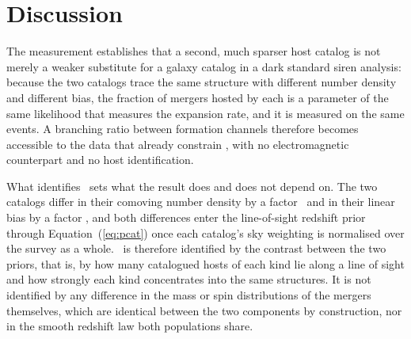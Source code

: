 \section{Discussion}
\label{sec:discussion}

The measurement establishes that a second, much sparser host catalog is not
merely a weaker substitute for a galaxy catalog in a dark standard siren
analysis: because the two catalogs trace the same structure with different
number density and different bias, the fraction of mergers hosted by each is a
parameter of the same likelihood that measures the expansion rate, and it is
measured on the same events. A branching ratio between formation channels
\citep{FordMcKernan2022} therefore becomes accessible to the data that already
constrain \Hz, with no electromagnetic counterpart and no host identification.

What identifies \fagn\ sets what the result does and does not depend on.
The two catalogs differ in
their comoving number density by a factor \DensityRatio\ and in their linear
bias by a factor \BiasRatioMeas, and both differences enter the line-of-sight
redshift prior through Equation~(\ref{eq:pcat}) once each catalog's sky
weighting is normalised over the survey as a whole. \fagn\ is therefore
identified by the contrast between the two priors, that is, by how many
catalogued hosts of each kind lie along a line of sight and how strongly each
kind concentrates into the same structures. It is not identified by any
difference in the mass or spin distributions of the mergers themselves, which
are identical between the two components by construction, nor in the smooth
redshift law both populations share.

